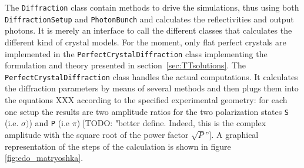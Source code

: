 \documentclass[preprint]{iucr}              %
\newcommand{\todo}[1]{{\color{red}[TODO: "#1'']}}
\begin{document}



The {\tt Diffraction} class contain methods to drive the simulations, thus using both {\tt DiffractionSetup} and {\tt PhotonBunch} and calculates the reflectivities and output photons. It is merely an interface to call the different classes that calculates the different kind of crystal models. For the moment, only flat perfect crystals are implemented in the {\tt PerfectCrystalDiffraction} class implementing the formulation and theory presented in section~\ref{sec:TTsolutions}. The {\tt PerfectCrystalDiffraction} class handles the actual computations. It calculates the diffraction parameters by means of
several methods and then plugs them into the equations XXX according to the specified experimental geometry: for each
one setup the results are two amplitude ratios for the two polarization
states {\tt S} (i.e. $\sigma)$) and {\tt P} (i.e $\pi$) \todo{better define. Indeed, this is the complex amplitude with the square root of the power factor $\sqrt{P}$}. A graphical representation of the steps
of the calculation is shown in figure \ref{fig:edo_matryoshka}.



\end{document}
